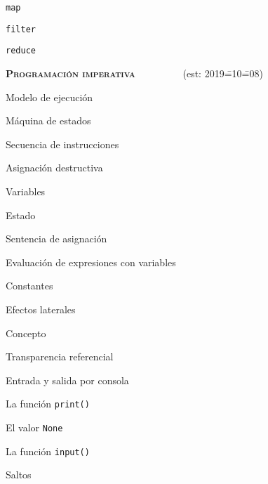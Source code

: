 \begin{longenum}
\begin{longenum}
\begin{longenum}
            \item \texttt{map}
            \item \texttt{filter}
            \item \texttt{reduce}
        \end{longenum}
    \end{longenum}
    \item \textbf{\textsc{Programación imperativa}} \ \ \ \ \ \ \ \ \ (est: 2019\==10\==08)
    \begin{longenum}
        \item Modelo de ejecución
        \begin{longenum}
            \item Máquina de estados
            \item Secuencia de instrucciones
        \end{longenum}
        \item Asignación destructiva
        \begin{longenum}
            \item Variables
            \item Estado
            \item Sentencia de asignación
            \item Evaluación de expresiones con variables
            \item Constantes
        \end{longenum}
        \item Efectos laterales
        \begin{longenum}
            \item Concepto
            \item Transparencia referencial
            \item Entrada y salida por consola
            \begin{longenum}
                \item La función \texttt{print()}
                \begin{longenum}
                    \item El valor \texttt{None}
                \end{longenum}
                \item La función \texttt{input()}
            \end{longenum}
        \end{longenum}
        \item Saltos
        \begin{longenum}

\end{longenum}
\end{longenum}
\end{longenum}
